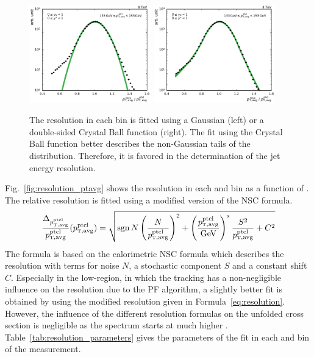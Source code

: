 \begin{figure}[h!tbp]
    \centering
    \includegraphics[width=0.47\textwidth]{figures/measurement/resolution_yb0ys0_bin10.pdf}\hfill
    \includegraphics[width=0.47\textwidth]{figures/measurement/resolution_yb0ys0_bin10_cb.pdf}
    \caption[Gaussian and Crystal Ball fit of resolution.]{The resolution in
        each \ptavg bin is fitted using a Gaussian (left) or a double-sided Crystal Ball
        function (right). The fit using the Crystal Ball function better describes the
        non-Gaussian tails of the distribution. Therefore, it is favored in the
    determination of the jet energy resolution.}
    \label{fig:resolution_bin}
\end{figure}

Fig.~\ref{fig:resolution_ptavg} shows the resolution in each \ystar and
\yboost bin as a function of \ptavg. The relative resolution is fitted using a
modified version of the NSC formula.
%
\begin{equation}
    \frac{\Delta_{\ptavggen}}{\ptavggen} (\ptavggen) = \sqrt{\sgn{N}
    \left(\frac{N}{\ptavggen}\right)^2 +
    \left(\frac{\ptavggen}{\text{GeV}}\right)^s \frac{S^2}{\ptavggen} + C^2 }
    \label{eq:resolution}
\end{equation}
%
The formula is based on the calorimetric NSC formula which describes the resolution
with terms for noise $N$, a stochastic component $S$ and a constant
shift $C$. Especially in the low-\pt region, in which the tracking has a
non-negligible influence on the resolution due to the PF algorithm, a
slightly better fit is obtained by using the modified resolution given in
Formula~\ref{eq:resolution}. However, the influence of the different resolution formulas
on the unfolded cross section is negligible as the spectrum starts at
much higher \ptavg. Table~\ref{tab:resolution_parameters} gives the parameters of
the fit in each \ystar and \yboost bin of the measurement.


